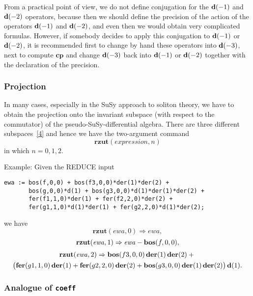 {From a practical point of view, we do not define conjugation for the
$\mathbf{d}(-1)$ and $\mathbf{d}(-2)$ operators, because then we should define the
precision of the action of the operators $\mathbf{d}(-1)$ and $\mathbf{d}(-2)$, and
even then we would obtain very complicated formulas.  However, if
somebody decides to apply this conjugation to $\mathbf{d}(-1)$ or $\mathbf{d}(-2)$, it
is recommended first to change by hand these operators into $\mathbf{d}(-3)$,
next to compute $\mathbf{cp}$ and change $\mathbf{d}(-3)$ back into $\mathbf{d}(-1)$
or $\mathbf{d}(-2)$ together with the declaration of the precision.

\subsubsection*{Projection}

In many cases, especially in the SuSy approach to soliton theory, we
have to obtain the projection onto the invariant subspace (with
respect to the commutator) of the pseudo-SuSy-differential algebra.
There are three different subspaces~\hyperlink{susy2-bib}{[4]} and
hence we have the two-argument command
\begin{equation*}
  \mathbf{rzut}(\mathit{expression},n)
\end{equation*}
in which $n=0,1,2$.

Example: Given the REDUCE input
\begin{verbatim}
ewa := bos(f,0,0) + bos(f3,0,0)*der(1)*der(2) +
       bos(g,0,0)*d(1) + bos(g3,0,0)*d(1)*der(1)*der(2) +
       fer(f1,1,0)*der(1) + fer(f2,2,0)*der(2) +
       fer(g1,1,0)*d(1)*der(1) + fer(g2,2,0)*d(1)*der(2);
\end{verbatim}
we have
\begin{equation*}
  \mathbf{rzut}(\mathit{ewa},0) \Rightarrow \mathit{ewa},
\end{equation*}
\begin{equation*}
  \mathbf{rzut}(\mathit{ewa},1) \Rightarrow \mathit{ewa}-\mathbf{bos}(f,0,0),
\end{equation*}
\begin{multline*}
  \mathbf{rzut}(\mathit{ewa},2) \Rightarrow
  \mathbf{bos}(f3,0,0)\,\mathbf{der}(1)\,\mathbf{der}(2) + \mbox{} \\
  \big( \mathbf{fer}(g1,1,0)\,\mathbf{der}(1) + \mathbf{fer}(g2,2,0)\,\mathbf{der}(2) +
  \mathbf{bos}(g3,0,0)\,\mathbf{der}(1)\,\mathbf{der}(2) \big)\,\mathbf{d}(1).
\end{multline*}

\subsubsection*{Analogue of \texttt{coeff}}

}
